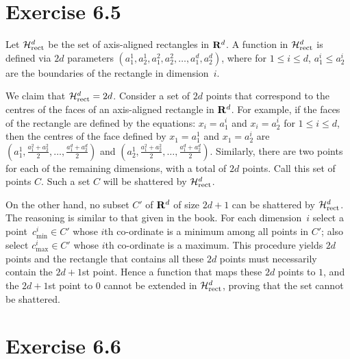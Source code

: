\section*{Exercise 6.5}

Let $\mathcal{H}_{\text{rect}}^{d}$ be the set of axis-aligned rectangles in $\mathbf{R}^{d}$. A function
in $\mathcal{H}_{\text{rect}}^{d}$ is defined via $2d$ parameters $(a_1^1, a_2^1, a_1^2, a_2^2,
\ldots, a_1^d, a_2^d)$, where for $1 \leq i \leq d$, $a_1^i \leq a_2^i$ are the
boundaries of the rectangle in dimension~$i$.

We claim that $\mathcal{H}_{\text{rect}}^{d} = 2d$. Consider a set of $2d$ points that correspond to
the centres of the faces of an axis-aligned rectangle in $\mathbf{R}^d$. For example,
if the faces of the rectangle are defined by the equations:
$x_i  = a_1^i$ and  $x_i = a_2^i$ for $1 \leq i \leq d$,
then the centres of the face defined by $x_1 = a_1^1$ and $x_1 = a_2^i$ are
$( a_1^1,  \frac{a_1^2 + a_2^2}{2},  \ldots, \frac{a_1^d + a_2^d}{2})$
and $( a_2^1,  \frac{a_1^2 + a_2^2}{2},  \ldots, \frac{a_1^d + a_2^d}{2})$.
Similarly, there are two points for each of the remaining dimensions, with a
total of $2d$ points. Call this set of points $C$. Such a set $C$ will be shattered
by $\mathcal{H}_{\text{rect}}^{d}$.

On the other hand, no subset $C'$ of $\mathbf{R}^d$ of size $2d + 1$ can be
shattered by $\mathcal{H}_{\text{rect}}^{d}$. The reasoning is similar to that given in the book.
For each dimension~$i$ select a point~$c_{\text{min}}^i \in C'$ whose $i$th
co-ordinate is a minimum among all points in $C'$; also select
$c_{\text{max}}^i \in C'$ whose $i$th co-ordinate is a maximum. This procedure
yields $2d$ points and the rectangle that contains all these $2d$ points must
necessarily contain the $2d + 1$st point. Hence a function that maps these $2d$
points to $1$, and the $2d + 1$st point to $0$ cannot be extended in
$\mathcal{H}_{\text{rect}}^{d}$, proving that the set cannot be shattered.

\section*{Exercise 6.6}

